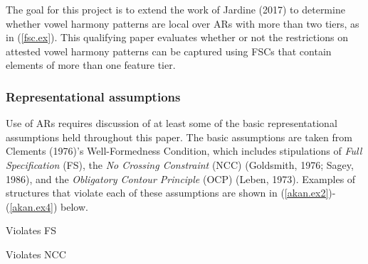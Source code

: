\documentclass[,doc,floatsintext]{apa6}
\theoremstyle{definition}
\theoremstyle{definition}
\theoremstyle{definition}
\theoremstyle{remark}
\begin{document}
The goal for this project is to extend the work of Jardine (2017) to
determine whether vowel harmony patterns are local over ARs with more
than two tiers, as in (\ref{fsc.ex}). This qualifying paper evaluates
whether or not the restrictions on attested vowel harmony patterns can
be captured using FSCs that contain elements of more than one feature
tier.

\subsubsection{Representational
assumptions}\label{representational-assumptions}

Use of ARs requires discussion of at least some of the basic
representational assumptions held throughout this paper. The basic
assumptions are taken from Clements (1976)'s Well-Formedness Condition,
which includes stipulations of \emph{Full Specification} (FS), the
\emph{No Crossing Constraint} (NCC) (Goldsmith, 1976; Sagey, 1986), and
the \emph{Obligatory Contour Principle} (OCP) (Leben, 1973). Examples of
structures that violate each of these assumptions are shown in
(\ref{akan.ex2})-(\ref{akan.ex4}) below.

\begin{exe}
\ex \label{akan.ex2} Violates FS
\end{exe}

\begin{exe}
\ex \label{akan.ex3} Violates NCC
\end{exe}
\end{document}
